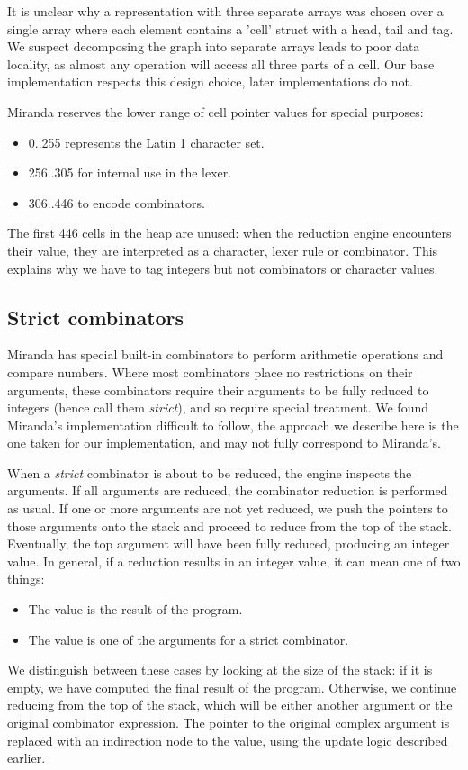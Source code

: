 \documentclass[conference]{IEEEtran}
\begin{document}
It is unclear why a representation with three separate arrays was chosen over a single array where each element contains a 'cell' struct with a head, tail and tag.
We suspect decomposing the graph into separate arrays leads to poor data locality, as almost any operation will access all three parts of a cell.
Our base implementation respects this design choice, later implementations do not.

Miranda reserves the lower range of cell pointer values for special purposes:
\begin{itemize}
    \item 0..255 represents the Latin 1 character set.
    \item 256..305 for internal use in the lexer.
    \item 306..446 to encode combinators.
\end{itemize}

The first 446 cells in the heap are unused: when the reduction engine encounters their value, they are interpreted as a character, lexer rule or combinator.
This explains why we have to tag integers but not combinators or character values.

\subsection{Strict combinators}
Miranda has special built-in combinators to perform arithmetic operations and compare numbers.
Where most combinators place no restrictions on their arguments, these combinators require their arguments to be fully reduced to integers (hence call them \textit{strict}), and so require special treatment.
We found Miranda's implementation difficult to follow, the approach we describe here is the one taken for our implementation, and may not fully correspond to Miranda's.

When a \textit{strict} combinator is about to be reduced, the engine inspects the arguments.
If all arguments are reduced, the combinator reduction is performed as usual.
If one or more arguments are not yet reduced, we push the pointers to those arguments onto the stack and proceed to reduce from the top of the stack.
Eventually, the top argument will have been fully reduced, producing an integer value.
In general, if a reduction results in an integer value, it can mean one of two things:
\begin{itemize}
    \item The value is the result of the program.
    \item The value is one of the arguments for a strict combinator.
\end{itemize}
We distinguish between these cases by looking at the size of the stack: if it is empty, we have computed the final result of the program.
Otherwise, we continue reducing from the top of the stack, which will be either another argument or the original combinator expression.
The pointer to the original complex argument is replaced with an indirection node to the value, using the update logic described earlier.
\end{document}
